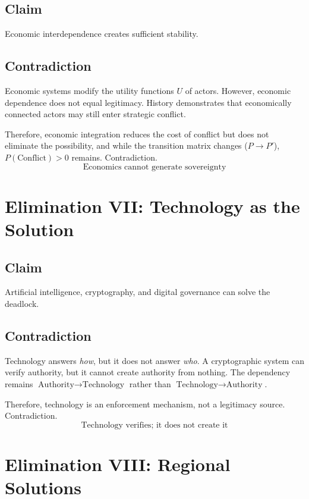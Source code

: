 \documentclass[11pt,openany]{book}
\theoremstyle{plain}
\theoremstyle{definition}
\begin{document}
\subsection*{Claim}

Economic interdependence creates sufficient stability.

\subsection*{Contradiction}

Economic systems modify the utility functions \(U\) of actors. However, economic dependence does not equal legitimacy. History demonstrates that economically connected actors may still enter strategic conflict. 

Therefore, economic integration reduces the cost of conflict but does not eliminate the possibility, and while the transition matrix changes (\(P \to P'\)), \(P(\text{Conflict}) > 0\) remains. Contradiction.
\[
\boxed{
\text{Economics cannot generate sovereignty}
}
\]

\section*{Elimination VII: Technology as the Solution}

\subsection*{Claim}

Artificial intelligence, cryptography, and digital governance can solve the deadlock.

\subsection*{Contradiction}

Technology answers \textit{how}, but it does not answer \textit{who}. A cryptographic system can verify authority, but it cannot create authority from nothing. The dependency remains \(\text{Authority} \to \text{Technology}\) rather than \(\text{Technology} \to \text{Authority}\). 

Therefore, technology is an enforcement mechanism, not a legitimacy source. Contradiction.
\[
\boxed{
\text{Technology verifies; it does not create it}
}
\]

\section*{Elimination VIII: Regional Solutions}
\end{document}
